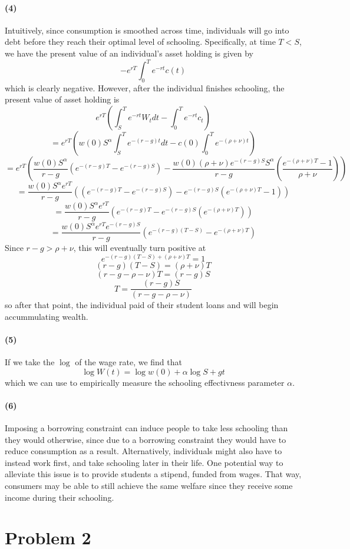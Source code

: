 \documentclass[10pt,letter]{article}
\newcommand{\problem}[1]{\section*{Problem #1}}
\newcommand{\problempart}[1]{\paragraph{#1}}
\begin{document}
\problempart{(4)}
Intuitively, since consumption is smoothed across time, individuals will go into debt before they reach their optimal level of schooling. Specifically, at time $T < S$, we have the present value of an individual's asset holding is given by
\[ -e^{rT}\int_0^T e^{-rt}c(t) \]
which is clearly negative. However, after the individual finishes schooling, the present value of asset holding is
\[ e^{rT}\left(\int_S^T e^{-rt} W_t dt - \int_0^T e^{-rt}c_t \right) \]
\[ = e^{rT}\left(w(0)S^{\alpha} \int_S^T e^{-(r-g)t} dt - c(0)\int_0^T  e^{-(\rho+\nu)t} \right) \]
\[ = e^{rT}\left(\frac{w(0)S^{\alpha}}{r-g} \left( e^{-(r-g)T} - e^{-(r-g)S}  \right)- \frac{w(0)(\rho+\nu) e^{-(r-g)S}S^\alpha }{r-g} \left(\frac{e^{-(\rho+\nu)T} - 1}{\rho+\nu}  \right) \right) \]
\[ = \frac{w(0)S^{\alpha}e^{rT}}{r-g}\left( \left( e^{-(r-g)T} - e^{-(r-g)S}  \right)-  e^{-(r-g)S} \left(e^{-(\rho+\nu)T} - 1  \right) \right) \]
\[ = \frac{w(0)S^{\alpha}e^{rT}}{r-g}\left(  e^{-(r-g)T} - e^{-(r-g)S} \left(e^{-(\rho+\nu)T} \right) \right) \]
\[ = \frac{w(0)S^{\alpha}e^{rT}e^{-(r-g)S}}{r-g}\left(   e^{-(r-g)(T-S)}- e^{-(\rho+\nu)T}  \right) \]
Since $r-g > \rho+\nu$, this will eventually turn positive at
\[ e^{-(r-g)(T-S) + (\rho + \nu)T} = 1 \]
\[ (r-g)(T-S) = (\rho + \nu)T \]
\[ (r-g - \rho - \nu)T = (r-g)S \]
\[ T = \frac{(r-g)S}{(r-g - \rho - \nu)} \]
so after that point, the individual paid of their student loans and will begin accummulating wealth.

\problempart{(5)}
If we take the $\log$ of the wage rate, we find that
\[ \log W(t) = \log w(0) + \alpha \log S + gt \]
which we can use to empirically measure the schooling effectivness parameter $\alpha$.
\problempart{(6)}
Imposing a borrowing constraint can induce people to take less schooling than they would otherwise, since due to a borrowing constraint they would have to reduce consumption as a result. Alternatively, individuals might also have to instead work first, and take schooling later in their life. One potential way to alleviate this issue is to provide students a stipend, funded from wages. That way, consumers may be able to still achieve the same welfare since they receive some income during their schooling.
\pagebreak
\problem{2}
\end{document}
